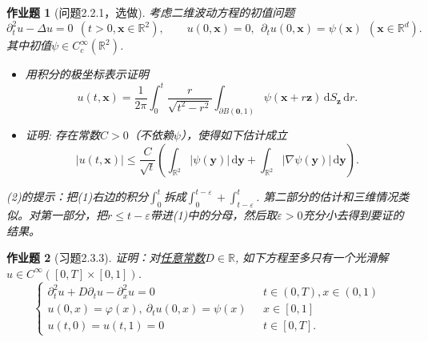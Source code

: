\documentclass[UTF8,fontset=windows,12pt]{ctexart}
\theoremstyle{kaiti-theorem}
\newtheorem{problem}{作业题}
\numberwithin{equation}{section}
\newcommand{\R}{\mathbb{R}}
\newcommand{\bd}[1]{\mathbf{#1}}  %
\newcommand{\bds}[1]{\boldsymbol{#1}}  %
\newcommand{\vp}{\varphi}
\newcommand{\q}{\quad}
\newcommand{\p}{\partial}
\newcommand{\lap}{\Delta}
\newcommand{\nab}{\nabla}
\newcommand{\dyy}{\,\mathrm{d}\bds{y}}
\newcommand{\dr}{\,\mathrm{d}r}
\newcommand{\dS}{\,\mathrm{d}S}
\newcommand{\eps}{\varepsilon}
\newcommand{\xx}{{\bds{x}}}
\newcommand{\yy}{{\bds{y}}}
\newcommand{\zz}{{\bds{z}}}
\begin{document}
\begin{problem}[问题2.2.1，选做]
考虑二维波动方程的初值问题
\[
\p_t^2 u-\lap u=0~~(t>0,\xx\in\R^2),\q\q u(0,\xx)=0,~~\p_tu(0,\xx)=\psi(\xx)~~(\xx\in\R^d).
\]其中初值$\psi\in C_c^\infty(\R^2)$.
\begin{itemize}
\item [(1)] 用积分的极坐标表示证明 $$u(t,\xx)=\frac{1}{2\pi}\int_0^t \frac{r}{\sqrt{t^2-r^2}}\int_{\p B(\bd{0},1)}\psi(\xx+r\zz)\dS_\zz\dr.$$
\item [(2)] 证明: 存在常数$C>0$（不依赖$\psi$），使得如下估计成立 $$|u(t,\xx)|\leqslant \frac{C}{\sqrt{t}}\left(\int_{\R^2}|\psi(\yy)|\dyy+\int_{\R^2}|\nab\psi(\yy)|\dyy\right).$$
\end{itemize}

(2)的提示：把(1)右边的积分$\int_0^t$拆成$\int_0^{t-\eps}+\int_{t-\eps}^t$. 第二部分的估计和三维情况类似。对第一部分，把$r\leqslant t-\eps$带进(1)中的分母，然后取$\eps>0$充分小去得到要证的结果。
\end{problem}

%

\begin{problem}[习题2.3.3] 
证明：对\underline{任意常数}$D\in\R$, 如下方程至多只有一个光滑解 $u\in C^{\infty}([0,T]\times[0,1])$.
\begin{equation}
\begin{cases}
\p_t^2 u+D\p_t u-\p_x^2 u=0~~~&t\in(0,T), x\in(0,1)\\
u(0,x)=\varphi(x),~\p_t u(0,x)=\psi(x)~~~&x\in [0,1]\\
u(t,0)=u(t,1)=0~~~&t\in[0,T].
\end{cases}
\end{equation}
\end{problem}
\end{document}
